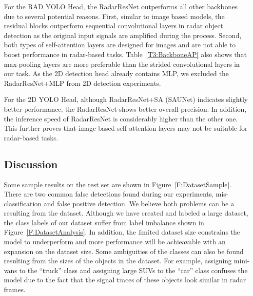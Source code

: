\documentclass[10pt, conference, compsocconf]{IEEEtran}
\begin{document}
For the RAD YOLO Head, the RadarResNet outperforms all other backbones due to several potential reasons. First, similar to image based models, the residual blocks outperform sequential convolutional layers in radar object detection as the original input signals are amplified during the process. Second, both types of self-attention layers are designed for images and are not able to boost performance in radar-based tasks. Table~\ref{T3:BackboneAP} also shows that max-pooling layers are more preferable than the strided convolutional layers in our task. 
As the 2D detection head already contains MLP, 
we excluded the RadarResNet+MLP from 2D detection experiments.

For the 2D YOLO Head, although RadarResNet+SA (SAUNet) indicates slightly better performance, the RadarResNet shows better overall precision. In addition, the inference speed of RadarResNet is considerably higher than the other one. This further proves that image-based self-attention layers may not be suitable for radar-based tasks.


\subsection{Discussion}

 Some sample results on the test set are shown in Figure~\ref{F:DatasetSample}. There are two common false detections found during our experiments, mis-classification and false positive detection. We believe both problems can be a resulting from the dataset. Although we have created and labeled a large dataset, the class labels of our dataset suffer from label imbalance shown in Figure~\ref{F:DatasetAnalysis}. In addition, the limited dataset size constrains the model to underperform and more performance will be achieavable with an expansion on the dataset size. Some ambiguities of the classes can also be found resulting from the sizes of the objects in the dataset. For example, assigning mini-vans to the ``truck'' class and assigning large SUVs to the ``car'' class confuses the model due to the fact that the signal traces of these objects look similar in radar frames.

\end{document}
